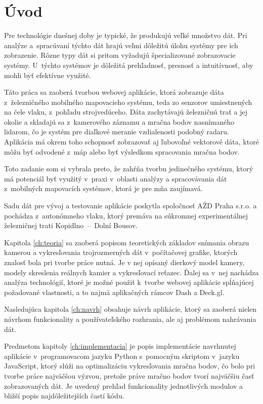 %

\chapter{Úvod}

Pre technológie dnešnej doby je typické, že produkujú veľké množstvo dát. Pri analýze a~spracúvaní týchto dát hrajú veľmi dôležitú úlohu systémy pre ich zobrazenie. Rôzne typy dát si pritom vyžadujú špecializované zobrazovacie systémy. U~týchto systémov je dôležitá prehľadnosť, presnosť a intuitívnosť, aby mohli byť efektívne využité.

Táto práca sa zaoberá tvorbou webovej aplikácie, ktorá zobrazuje dáta z~železničného mobilného mapovacieho systému, teda zo senzorov umiestnených na čele vlaku, z~pohľadu strojvedúceho. Dáta zachytávajú železničnú trať a jej okolie a skladajú sa z~kamerového záznamu a mračna bodov nasnímaného lidarom, čo je systém pre diaľkové meranie vzdialenosti podobný radaru. Aplikácia má okrem toho schopnosť zobrazovať aj ľubovoľné vektorové dáta, ktoré môžu byť odvodené z~máp alebo byť výsledkom spracovania mračna bodov.

Toto zadanie som si vybrala preto, že zahŕňa tvorbu jedinečného systému, ktorý má potenciál byť využitý v~praxi v~oblasti analýzy a spracovávania dát z~mobilných mapovacích systémov, ktorá je pre mňa zaujímavá.

Sadu dát pre vývoj a testovanie aplikácie poskytla spoločnosť AŽD Praha s.r.o. a pochádza z~autonómneho vlaku, ktorý premáva na súkromnej experimentálnej železničnej trati Kopidlno~--~Dolní Bousov.

Kapitola \ref{ch:teoria} sa zaoberá popisom teoretických základov snímania obrazu kamerou a vykresľovania trojrozmerných dát v~počítačovej grafike, ktorých znalosť bola pri tvorbe práce nutná. Je v nej opísaný dierkový model kamery, modely skreslenia reálnych kamier a vykresľovací reťazec. Ďalej sa v~nej nachádza analýza technológií, ktoré je možné použiť k~tvorbe webovej aplikácie spĺňajúcej požadované vlastnosti, a to najmä aplikačných rámcov Dash a Deck.gl.

Nasledujúca kapitola \ref{ch:navrh} obsahuje návrh aplikácie, ktorý sa zaoberá nielen návrhom funkcionality a používateľského rozhrania, ale aj problémom nahrávania dát.

Predmetom kapitoly \ref{ch:implementacia} je popis implementácie navrhnutej aplikácie v~programovacom jazyku Python s~pomocným skriptom v~jazyku JavaScript, ktorý slúži na optimalizáciu vykresľovania mračna bodov, čo bolo pri tvorbe práce najväčšou výzvou, pretože práve mračno bodov tvorí najväčšiu časť zobrazovaných dát. Je uvedený prehľad funkcionality jednotlivých modulov a bližší popis najdôležitejších častí kódu.

